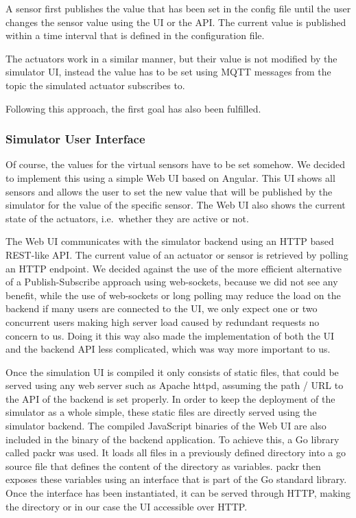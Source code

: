 A sensor first publishes the value that has been set in the config file
until the user changes the sensor value using the UI or the API. The
current value is published within a time interval that is defined in the
configuration file.

The actuators work in a similar manner, but their value is not modified
by the simulator UI, instead the value has to be set using MQTT messages
from the topic the simulated actuator subscribes to.

Following this approach, the first goal has also been fulfilled.

\subsubsection{Simulator User Interface}\label{subsubsec:ui}

Of course, the values for the virtual sensors have to be set somehow. We
decided to implement this using a simple Web UI based on Angular. This
UI shows all sensors and allows the user to set the new value that will
be published by the simulator for the value of the specific sensor. The
Web UI also shows the current state of the actuators, i.e.~whether they
are active or not.

The Web UI communicates with the simulator backend using an HTTP based
REST-like API. The current value of an actuator or sensor is retrieved
by polling an HTTP endpoint.
We decided against the use of the more
efficient alternative of a Publish-Subscribe approach using web-sockets,
because we did not see any benefit, while the use of web-sockets or long
polling may reduce the load on the backend if many users are connected
to the UI, we only expect one or two concurrent users making high server
load caused by redundant requests no concern to us.
Doing it this way
also made the implementation of both the UI and the backend API less
complicated, which was way more important to us.

Once the simulation UI is compiled it only consists of static files,
that could be served using any web server such as Apache httpd, assuming
the path / URL to the API of the backend is set properly.
In order to
keep the deployment of the simulator as a whole simple, these static
files are directly served using the simulator backend.
The compiled
JavaScript binaries of the Web UI are also included in the binary of the
backend application.
To achieve this, a Go library called packr was
used.
It loads all files in a previously defined directory into a go
source file that defines the content of the directory as variables.
packr then exposes these variables using an interface that is part of
the Go standard library.
Once the interface has been instantiated, it
can be served through HTTP, making the directory or in our case the UI
accessible over HTTP.

